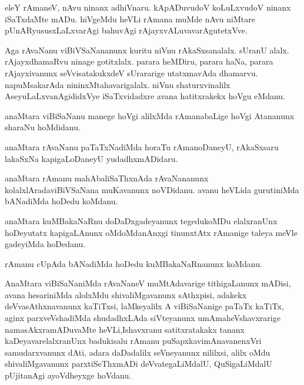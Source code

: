 \documentclass{article}
\begin{document}
\begin{mn}
eleY  rAmaneV,  nAvu  ninanx  adhiVnaru.  kApADuvudoV  koLuLxvudoV  ninanx  iSaTxdaMte  mADu.  hiVgeMdu  heVLi  rAmana  
muMde  nAvu  niMtare  pUnARyususxLaLxvarAgi  bahuvAgi  rAjayxvALuvavarAgutetxVve.
\end{mn}

\begin{mn}
Aga  rAvaNanu  viBiVSaNananunx  kuritu  niVnu  rAkaSxsanalalx.  sUranU  alalx.  rAjayxdhamaRvu  ninage  gotitxlalx.  parara  heMDiru,  
parara  haNa,  parara  rAjayxivanunx  seVvisatakukxdeV  sUrararige  utatxmavAda  dhamarvu.  napuMsakarAda  nininxMtahavarigalalx.  niVnu  
shaturxvinalilx  AseyuLaLxvanAgididxVye  iSaTxvidadxre  avana  hatitxrakekx  hoVgu  eMdanu.
\end{mn}

\begin{mn}
anaMtara  viBiSaNanu  manege  hoVgi  alilxMda  rAmanabaLige  hoVgi  Atananunx  sharaNu  hoMdidanu.
\end{mn}

\begin{mn}
anaMtara  rAvaNanu  paTaTxNadiMda  horaTu  rAmanoDaneyU,  rAkaSxsaru  lakaSxNa  kapigaLoDaneyU  yudadhxmADidaru.
\end{mn}

\begin{mn}
anaMtara  rAmanu  mahAbaliSaThxnAda  rAvaNananunx  kolalxlAradaviBiVSaNana  muKavanunx  noVDidanu.  avanu  heVLida  gurutiniMda  
bANadiMda  hoDedu  koMdanu.
\end{mn}

\begin{mn}
anaMtara  kuMBakaNaRnu  doDaDxgadeyanunx  tegedukoMDu  elalxranUnx  hoDeyutatx  kapigaLAnunx  oMdoMdanAnxgi  tinunxtAtx  rAmanige  
taleya meVle  gadeyiMda  hoDedanu.
\end{mn}

\begin{mn}
rAmanu  cUpAda  bANadiMda  hoDedu  kuMBakaNaRnanunx  koMdanu.
\end{mn}

\begin{mn}
AnaMtara  viBiSaNaniMda  rAvaNaneV  muMtAdavarige  tithigaLanunx  mADisi,  avana  hesariniMda  alolxMdu  shivaliMgavanunx  sAthxpisi,  
adakekx  deVvasAthxnavanunx  kaTiTxsi,  laMkeyalilx  A  viBiSaNanige  paTaTx kaTiTx,  aginx parxveVshadiMda  shudadhxLAda  siVteyanunx  
umAmaheVshavxrarige  namasAkxramADuvaMte  heVLi,Ishavxranu  satitxratakakx  tananx  kaDeyavarelalxranUnx  badukisalu  rAmanu  
puSapxkavimAnavanenxVri  samudarxvanunx  dAti,  adara  daDadalilx  seVneyanunx  nililxsi,  alilx  oMdu  shivaliMgavanunx  parxtiSeThxmADi  
deVvategaLiMdalU,  QuSigaLiMdalU  pUjitanAgi  ayoVdheyxge  hoVdanu.
\end{mn}
\end{document}

